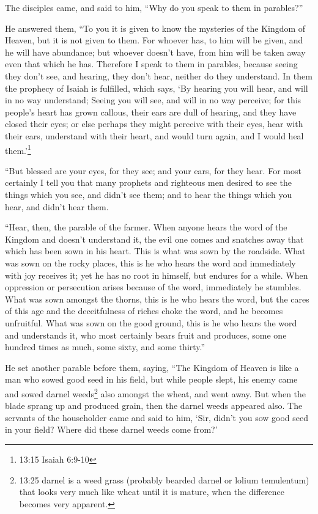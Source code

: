  The disciples came, and said to him, ``Why do you speak to
them in parables?''

 He answered them, ``To you it is given to know the
mysteries of the Kingdom of Heaven, but it is not given to them.
 For whoever has, to him will be given, and he will have
abundance; but whoever doesn't have, from him will be taken away even
that which he has.  Therefore I speak to them in parables,
because seeing they don't see, and hearing, they don't hear, neither do
they understand.  In them the prophecy of Isaiah is
fulfilled, which says, `By hearing you will hear, and will in no way
understand; Seeing you will see, and will in no way perceive;
 for this people's heart has grown callous, their ears are
dull of hearing, and they have closed their eyes; or else perhaps they
might perceive with their eyes, hear with their ears, understand with
their heart, and would turn again, and I would heal them.'\footnote{13:15
  Isaiah 6:9-10}

 ``But blessed are your eyes, for they see; and your ears,
for they hear.  For most certainly I tell you that many
prophets and righteous men desired to see the things which you see, and
didn't see them; and to hear the things which you hear, and didn't hear
them.

 ``Hear, then, the parable of the farmer. 
When anyone hears the word of the Kingdom and doesn't understand it, the
evil one comes and snatches away that which has been sown in his heart.
This is what was sown by the roadside.  What was sown on
the rocky places, this is he who hears the word and immediately with joy
receives it;  yet he has no root in himself, but endures
for a while. When oppression or persecution arises because of the word,
immediately he stumbles.  What was sown amongst the thorns,
this is he who hears the word, but the cares of this age and the
deceitfulness of riches choke the word, and he becomes unfruitful.
 What was sown on the good ground, this is he who hears the
word and understands it, who most certainly bears fruit and produces,
some one hundred times as much, some sixty, and some thirty.''

 He set another parable before them, saying, ``The Kingdom
of Heaven is like a man who sowed good seed in his field, 
but while people slept, his enemy came and sowed darnel weeds\footnote{13:25
  darnel is a weed grass (probably bearded darnel or lolium temulentum)
  that looks very much like wheat until it is mature, when the
  difference becomes very apparent.} also amongst the wheat, and went
away.  But when the blade sprang up and produced grain,
then the darnel weeds appeared also.  The servants of the
householder came and said to him, `Sir, didn't you sow good seed in your
field? Where did these darnel weeds come from?'

